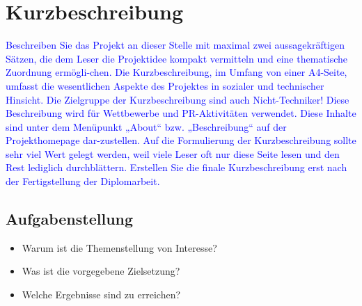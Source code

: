 \documentclass[12pt]{article}
\newcommand{\todayD}{\the\day.\the\month.\the\year}
\begin{document}



\fancyhf[EFL]{\todayD}
\fancyhf[OFL]{\todayD}


\fancyhf[EFR]{\thepage}
\fancyhf[OFR]{\thepage}


\newpage
\normalsize

\section*{Kurzbeschreibung}
\textcolor{blue}{
Beschreiben Sie das Projekt an dieser Stelle mit maximal zwei aussagekräftigen Sätzen, die dem Leser die Projektidee kompakt vermitteln und eine thematische Zuordnung ermögli-chen.
Die Kurzbeschreibung, im Umfang von einer A4-Seite, umfasst die wesentlichen Aspekte des Projektes in sozialer und technischer Hinsicht. Die Zielgruppe der Kurzbeschreibung sind auch Nicht-Techniker! 
Diese Beschreibung wird für Wettbewerbe und PR-Aktivitäten verwendet. Diese Inhalte sind unter dem Menüpunkt „About“ bzw. „Beschreibung“ auf der Projekthomepage dar-zustellen. Auf die Formulierung der Kurzbeschreibung sollte sehr viel Wert gelegt werden, weil viele Leser oft nur diese Seite lesen und den Rest lediglich durchblättern. Erstellen Sie die finale Kurzbeschreibung erst nach der Fertigstellung der Diplomarbeit.}

\color{blue}
\subsection*{Aufgabenstellung}
\begin{itemize}
    \item Warum ist die Themenstellung von Interesse?
    \item Was ist die vorgegebene Zielsetzung?
    \item Welche Ergebnisse sind zu erreichen?
\end{itemize}
\end{document}
